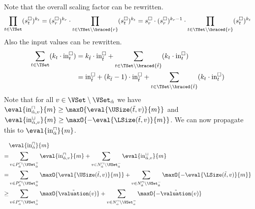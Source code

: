 Note that the overall scaling factor can be rewritten.
\begin{equation} \label{eq:scaling_factor_reduction}
  \prod_{t \in \TSet} (s^\square_t)^{k_t} = (s^\square_r)^{k_r} \cdot \prod_{t \in \TSet \setminus \braced{r}} (s^\square_t)^{k_t} = s^\square_r \cdot (s^\square_r)^{k_r - 1} \cdot \prod_{t \in \TSet \setminus \braced{r}} (s^\square_t)^{k_t}
\end{equation}
Also the input values can be rewritten.
\begin{equation} \label{eq:input_reduction}
  \begin{split}
  \sum_{t \in \TSet} (k_t \cdot \text{in}^\square_t)
  & = k_{\hat{t}} \cdot \text{in}^\square_{\hat{t}} + \sum_{t \in \TSet \setminus \braced{\hat{t}}} (k_t \cdot \text{in}^\square_t) \\
  & = \text{in}^\square_{\hat{t}}
    + (k_{\hat{t}} - 1) \cdot \text{in}^\square_{\hat{t}}
    + \sum_{t \in \TSet \setminus \braced{\hat{t}}} (k_t \cdot \text{in}^\square_t)
  \end{split}
\end{equation}
Note that for all $v \in \VSet \setminus \VSet_{\hat{\alpha}}$ we have $\eval{\text{in}^\sqcap_{\hat{\alpha},v}}{m} \geq \maxO{\eval{\USize(\tilde{t}, v)}{m}}$ and $\eval{\text{in}^\sqcup_{\hat{\alpha},v}}{m} \geq \maxO{-\eval{\LSize(\tilde{t}, v)}{m}}$.
We can now propagate this to $\eval{\text{in}^\sqcap_{\hat{\alpha}}}{m}$.

\begin{equation} \label{eq:input_rv_reduction_upper}
  \begin{split}
  & \eval{\text{in}^\sqcap_{\hat{\alpha}}}{m} \\
  = & \sum_{v \in P_{\hat{\alpha}}^\sqcap \setminus \VSet^+_{\hat{\alpha}}} \eval{\text{in}^\sqcap_{{\hat{\alpha}},v}}{m}
    + \sum_{v \in N_{\hat{\alpha}}^\sqcap \setminus \VSet^-_{\hat{\alpha}}} \eval{\text{in}^\sqcup_{{\hat{\alpha}},v}}{m} \\
  = & \sum_{v \in P_{\hat{\alpha}}^\sqcap \setminus \VSet^+_{\hat{\alpha}}} \maxO{\eval{\USize(\tilde{t}, v)}{m}}
    + \sum_{v \in N_{\hat{\alpha}}^\sqcap \setminus \VSet^-_{\hat{\alpha}}} \maxO{-\eval{\LSize(\tilde{t}, v)}{m}} \\
  \geq & \sum_{v \in P_{\hat{\alpha}}^\sqcap \setminus \VSet^+_{\hat{\alpha}}} \maxO{\tilde{\valuation}(v)}
    + \sum_{v \in N_{\hat{\alpha}}^\sqcap \setminus \VSet^-_{\hat{\alpha}}} \maxO{-\tilde{\valuation}(v)} \\
  \end{split}
\end{equation}

